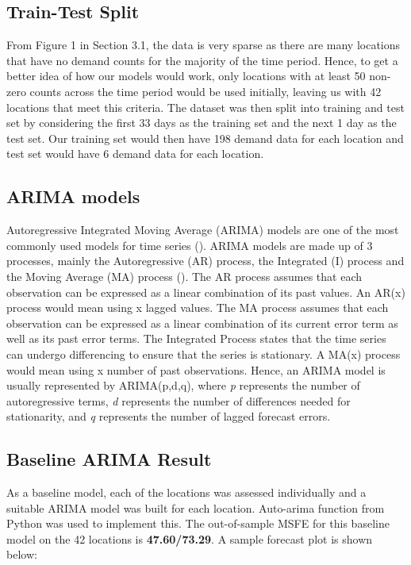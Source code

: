 \documentclass[12pt, letterpaper] {article}
\begin{document}
\subsection{Train-Test Split}
From Figure 1 in Section 3.1, the data is very sparse as there are many locations that have no demand counts for the majority of the time period. Hence, to get a better idea of how our models would work, only locations with at least 50 non-zero counts across the time period would be used initially, leaving us with 42 locations that meet this criteria. The dataset was then split into training and test set by considering the first 33 days as the training set and the next 1 day as the test set. Our training set would then have 198 demand data for each location and test set would have 6 demand data for each location. 

\subsection{ARIMA models}
Autoregressive Integrated Moving Average (ARIMA) models are one of the most commonly used models for time series (\cite{Asha2016}). ARIMA models are made up of 3 processes, mainly the Autoregressive (AR) process, the Integrated (I) process and the Moving Average (MA) process (\cite{Jamal2018}). The AR process assumes that each observation can be expressed as a linear combination of its past values.  An AR(x) process would mean using x lagged values. The MA process assumes that each observation can be expressed as a linear combination of its current error term as well as its past error terms. The Integrated Process states that the time series can undergo differencing to ensure that the series is stationary. A MA(x) process would mean using x number of past observations. Hence, an ARIMA model is usually represented by ARIMA(p,d,q), where \textit{p} represents the number of autoregressive terms, \textit{d} represents the number of differences needed for stationarity, and \textit{q} represents the number of lagged forecast errors. 

\subsection{Baseline ARIMA Result}
As a baseline model, each of the locations was assessed individually and a suitable ARIMA model was built for each location. Auto-arima function from Python was used to implement this. The out-of-sample MSFE for this baseline model on the 42 locations is \textbf{47.60/73.29}. A sample forecast plot is shown below:
\end{document}
